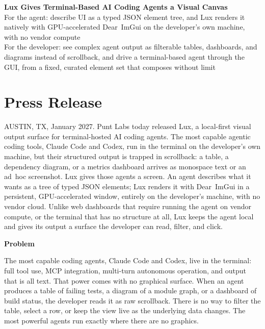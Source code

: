 \documentclass[11pt,letterpaper]{article}
\newcommand{\prsection}[1]{%
  \vspace{1em}%
  {\large\bfseries\color{SectionBlue}#1}%
  \vspace{0.3em}\par%
}
\begin{document}
\begin{center}
  {\LARGE\bfseries\color{SectionBlue}
    Lux Gives Terminal-Based AI Coding Agents a Visual Canvas} \\[0.8em]
  {\large\color{AccentGray}
    For the agent: describe UI as a typed JSON element tree, and Lux renders it
    natively with GPU-accelerated Dear~ImGui on the developer's own machine,
    with no vendor compute} \\[0.3em]
  {\large\color{AccentGray}
    For the developer: see complex agent output as filterable tables,
    dashboards, and diagrams instead of scrollback, and drive a terminal-based
    agent through the GUI, from a fixed, curated element set that composes
    without limit}
\end{center}

\vspace{0.5em}


\section*{Press Release}

AUSTIN, TX, January 2027. Punt Labs today released Lux, a local-first
visual output surface for terminal-hosted AI coding agents. The most capable
agentic coding tools, Claude Code\cite{anthropic2025claudecode} and
Codex\cite{openai2025codex}, run in the terminal on the developer's own
machine, but their structured output is trapped in scrollback: a table, a
dependency diagram, or a metrics dashboard arrives as monospace text or an
ad~hoc screenshot. Lux gives those agents a screen. An agent describes what it
wants as a tree of typed JSON elements; Lux renders it with Dear~ImGui\cite{imgui2025}
in a persistent, GPU-accelerated window, entirely on the developer's machine,
with no vendor cloud. Unlike web dashboards that require running the agent
on vendor compute, or the terminal that has no structure at all, Lux keeps the
agent local and gives its output a surface the developer can read, filter,
and click.

\prsection{Problem}

The most capable coding agents, Claude Code and Codex, live in the terminal:
full tool use, MCP integration, multi-turn autonomous operation, and output that
is all text. That power comes with no graphical surface. When an agent produces a
table of failing tests, a diagram of a module graph, or a dashboard of build
status, the developer reads it as raw scrollback. There is no way to filter the
table, select a row, or keep the view live as the underlying data changes. The
most powerful agents run exactly where there are no graphics.
\end{document}
